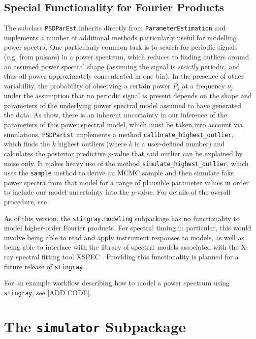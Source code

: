 \documentclass[12pt]{emulateapj}
\newcommand{\stingray}{\texttt{stingray}\xspace}
\begin{document}
\subsection{Special Functionality for Fourier Products}

The subclass \verb|PSDParEst| inherits directly from \verb|ParameterEstimation| and implements a number of additional methods particularly useful for modelling power spectra. One particularly common task is to search for periodic signals (e.g. from pulsars) in a power spectrum, which reduces to finding outliers around an assumed power spectral shape (assuming the signal is \textit{strictly} periodic, and thus all power approximately concentrated in one bin). In the presence of other variability, the probability of observing a certain power $P_j$ at a frequency $\nu_j$ under the assumption that no periodic signal is present depends on the shape and parameters of the underlying power spectral model assumed to have generated the data. As \citet{vaughan2010} show, there is an inherent uncertainty in our inference of the parameters of this power spectral model, which must be taken into account via simulations. \verb|PSDParEst| implements a method \verb|calibrate_highest_outlier|, which finds the $k$ highest outliers (where $k$ is a user-defined number) and calculates the posterior predictive $p$-value that said outlier can be explained by noise only. It makes heavy use of the method \verb|simulate_highest_outlier|, which uses the \verb|sample| method to derive an MCMC sample and then simulate fake power spectra from that model for a range of plausible parameter values in order to include our model uncertainty into the $p$-value. For details of the overall procedure, see \citet{vaughan2010}. 

As of this version, the \verb|stingray.modeling| subpackage has no functionality to model higher-order Fourier products. For spectral timing in particular, this would involve being able to read and apply instrument responses to models, as well as being able to interface with the library of spectral models associated with the X-ray spectral fitting tool XSPEC \citep{arnaud1996}. Providing this functionality is planned for a future release of \stingray. 

For an example workflow describing how to model a power spectrum using \stingray, see [ADD CODE].

\section{The \texttt{simulator} Subpackage}
\label{sec:simulator}
\end{document}
